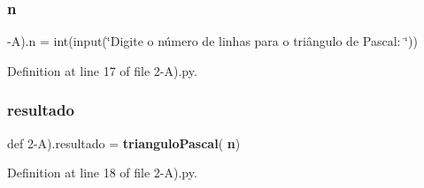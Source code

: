\subsubsection{n}
{\footnotesize{}-\/A).n = int(input(\char`\"{}Digite o número de linhas para o triângulo de Pascal\+: \char`\"{}))}



Definition at line 17 of file 2-\/\+A).\+py.

\mbox{\label{namespace2-_a_08_a7ebc75ee44e5c304e5fb2dce1f099214}} 
\subsubsection{resultado}
{\footnotesize\ttfamily def 2-\/A).resultado = \textbf{ triangulo\+Pascal}(\textbf{ n})}



Definition at line 18 of file 2-\/\+A).\+py.

